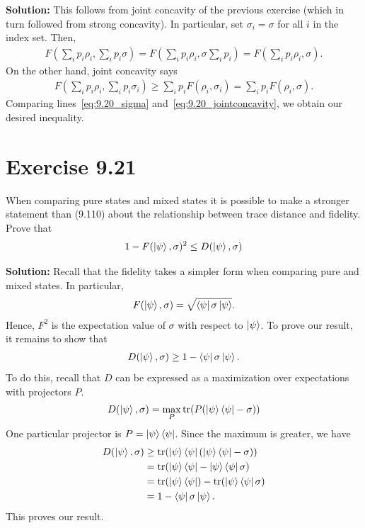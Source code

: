 \documentclass{book}
\begin{document}
    \textbf{Solution:} This follows from joint concavity of the previous exercise (which in turn followed from strong concavity). In particular, set $\sigma_i = \sigma$ for all $i$ in the index set. Then, 
    \begin{align} \label{eq:9.20_sigma}
        F\left(\sum_i p_i \rho_i, \sum_i p_i \sigma\right) = F\left(\sum_i p_i \rho_i, \sigma \sum_i p_i \right) = F\left(\sum_i p_i \rho_i, \sigma\right).
    \end{align}
    On the other hand, joint concavity says
    \begin{align}\label{eq:9.20_jointconcavity}
        F\left(\sum_i p_i \rho_i, \sum_i p_i \sigma_i\right)  \geq \sum_i p_i F(\rho_i, \sigma_i) = \sum_i p_i F(\rho_i, \sigma).
    \end{align}
    Comparing lines~\eqref{eq:9.20_sigma} and~\eqref{eq:9.20_jointconcavity}, we obtain our desired inequality. 

\section*{Exercise 9.21}
    When comparing pure states and mixed states it is possible to make a stronger statement than (9.110) about the relationship between trace distance and fidelity. Prove that
    \begin{align}
        1 - F(\ket{\psi}, \sigma)^2 \leq D(\ket{\psi},\sigma)
    \end{align}

    \textbf{Solution:} Recall that the fidelity takes a simpler form when comparing pure and mixed states. In particular,
    \begin{align}
        F(\ket{\psi},\sigma) = \sqrt{\bra{\psi}\sigma\ket{\psi}}.
    \end{align}
    Hence, $F^2$ is the expectation value of $\sigma$ with respect to $\ket{\psi}$. To prove our result, it remains to show that
    \begin{align}
        D(\ket{\psi}, \sigma) \geq 1 - \bra{\psi}\sigma \ket{\psi}.
    \end{align}
    To do this, recall that $D$ can be expressed as a maximization over expectations with projectors $P$.
    \begin{align}
        D(\ket{\psi},\sigma) = \max_P \tr(P (\ket{\psi}\bra{\psi}-\sigma))
    \end{align}
    One particular projector is $P = \ket{\psi}\bra{\psi}$. Since the maximum is greater, we have
    \begin{align}
    \begin{aligned}
        D(\ket{\psi}, \sigma) &\geq \tr(\ket{\psi}\bra{\psi}(\ket{\psi}\bra{\psi}-\sigma)) \\
        &= \tr(\ket{\psi}\bra{\psi} - \ket{\psi}\bra{\psi} \sigma) \\
        &= \tr(\ket{\psi}\bra{\psi}) - \tr(\ket{\psi}\bra{\psi} \sigma)\\
        &= 1 - \bra{\psi}\sigma \ket{\psi}.
    \end{aligned}
    \end{align}
    This proves our result.
\end{document}
